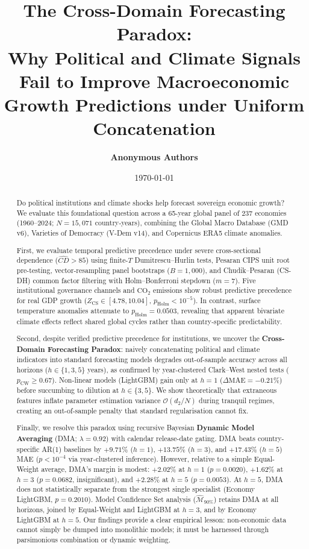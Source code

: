 \documentclass[11pt,a4paper]{article}
\title{\textbf{The Cross-Domain Forecasting Paradox:\\Why Political and Climate Signals Fail to Improve Macroeconomic Growth Predictions under Uniform Concatenation}}
\author{
  \textbf{Anonymous Authors}
}
\date{\today}
\begin{document}
\maketitle

\begin{abstract}
Do political institutions and climate shocks help forecast sovereign economic growth? We evaluate this foundational question across a 65-year global panel of 237 economies (1960--2024; $N = 15{,}071$ country-years), combining the Global Macro Database (GMD v6), Varieties of Democracy (V-Dem v14), and Copernicus ERA5 climate anomalies. 

First, we evaluate temporal predictive precedence under severe cross-sectional dependence ($\hat{CD} > 85$) using finite-$T$ Dumitrescu--Hurlin tests, Pesaran CIPS unit root pre-testing, vector-resampling panel bootstraps ($B=1{,}000$), and Chudik--Pesaran (CS-DH) common factor filtering with Holm--Bonferroni stepdown ($m=7$). Five institutional governance channels and $\text{CO}_2$ emissions show robust predictive precedence for real GDP growth ($Z_{\text{CS}} \in [4.78, 10.04]$, $p_{\text{Holm}} < 10^{-5}$). In contrast, surface temperature anomalies attenuate to $p_{\text{Holm}} = 0.0503$, revealing that apparent bivariate climate effects reflect shared global cycles rather than country-specific predictability. 

Second, despite verified predictive precedence for institutions, we uncover the \textbf{Cross-Domain Forecasting Paradox}: naively concatenating political and climate indicators into standard forecasting models degrades out-of-sample accuracy across all horizons ($h \in \{1, 3, 5\}$ years), as confirmed by year-clustered Clark--West nested tests ($p_{\text{CW}} \ge 0.67$). Non-linear models (LightGBM) gain only at $h=1$ ($\Delta\text{MAE} = -0.21\%$) before succumbing to dilution at $h \in \{3, 5\}$. We show theoretically that extraneous features inflate parameter estimation variance $\mathcal{O}(d_2/N)$ during tranquil regimes, creating an out-of-sample penalty that standard regularisation cannot fix.

Finally, we resolve this paradox using recursive Bayesian \textbf{Dynamic Model Averaging} (DMA; $\lambda = 0.92$) with calendar release-date gating. DMA beats country-specific AR(1) baselines by $+9.71\%$ ($h=1$), $+13.75\%$ ($h=3$), and $+17.43\%$ ($h=5$) MAE ($p < 10^{-4}$ via year-clustered inference). However, relative to a simple Equal-Weight average, DMA's margin is modest: $+2.02\%$ at $h=1$ ($p = 0.0020$), $+1.62\%$ at $h=3$ ($p = 0.0682$, insignificant), and $+2.28\%$ at $h=5$ ($p = 0.0053$). At $h=5$, DMA does not statistically separate from the strongest single specialist (Economy LightGBM, $p = 0.2010$). Model Confidence Set analysis ($\widehat{\mathcal{M}}_{90\%}$) retains DMA at all horizons, joined by Equal-Weight and LightGBM at $h=3$, and by Economy LightGBM at $h=5$. Our findings provide a clear empirical lesson: non-economic data cannot simply be dumped into monolithic models; it must be harnessed through parsimonious combination or dynamic weighting.
\end{abstract}
\end{document}
